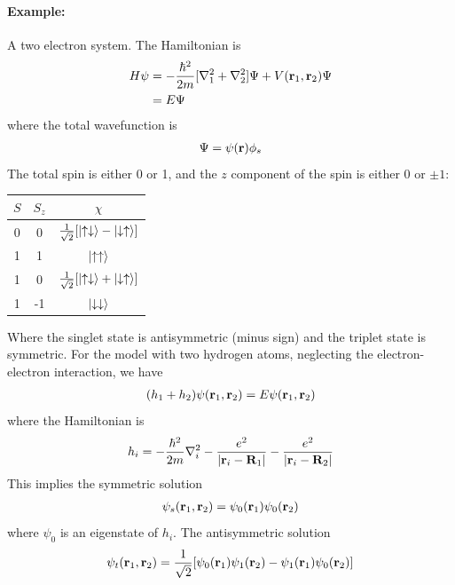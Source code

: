 \documentclass[../main.tex]{subfiles}
\begin{document}
\paragraph*{Example:} A two electron system. The Hamiltonian is 
\begin{align*}
    H \psi &= - \frac{\hbar^2}{2m} [\laplacian_1 + \laplacian_2] \Psi + V(\vb r_1, \vb r_2) \Psi \\
    &= E \Psi
\end{align*}
where the total wavefunction is
\begin{align*}
    \Psi = \psi(\vb r) \phi_s
\end{align*}
The total spin is either 0 or 1, and the $z$ component of the spin is either $0$ or $\pm 1$:
\begin{center}
        \begin{tabular}{c|c|c}
            \hline
            $S$ & $S_z$ & $\chi$ \\
            \hline
            0 & 0 & $\frac{1}{\sqrt{2}} [\ket{\uparrow \downarrow} - \ket{\downarrow \uparrow}]$ \\
            \hline
            1 & 1 & $\ket{\uparrow \uparrow}$ \\
            1 & 0 & $\frac{1}{\sqrt{2}} [\ket{\uparrow \downarrow} + \ket{\downarrow \uparrow}]$ \\
            1 & -1 & $\ket{\downarrow \downarrow}$ \\
            \hline
        \end{tabular}
\end{center}
Where the singlet state is antisymmetric (minus sign) and the triplet state is symmetric. For the
model with two hydrogen atoms, neglecting the electron-electron interaction, we have
\begin{align*}
    (h_1 + h_2) \psi(\vb r_1, \vb r_2) = E \psi(\vb r_1, \vb r_2)
\end{align*}
where the Hamiltonian is
\begin{align*}
    h_i = -\frac{\hbar^2}{2m} \laplacian_i - \frac{e^2}{\abs{\vb r_i - \vb R_1}}
        - \frac{e^2}{\abs{\vb r_i - \vb R_2}}
\end{align*}
This implies the symmetric solution
\begin{align*}
    \psi_s (\vb r_1, \vb r_2) = \psi_0 (\vb r_1) \psi_0 (\vb r_2)
\end{align*}
where $\psi_0$ is an eigenstate of $h_i$. The antisymmetric solution
\begin{align*}
    \psi_t (\vb r_1, \vb r_2) = \frac{1}{\sqrt{2}} [\psi_0 (\vb r_1) \psi_1 (\vb r_2) - \psi_1 (\vb r_1) \psi_0 (\vb r_2)]
\end{align*}
\end{document}
